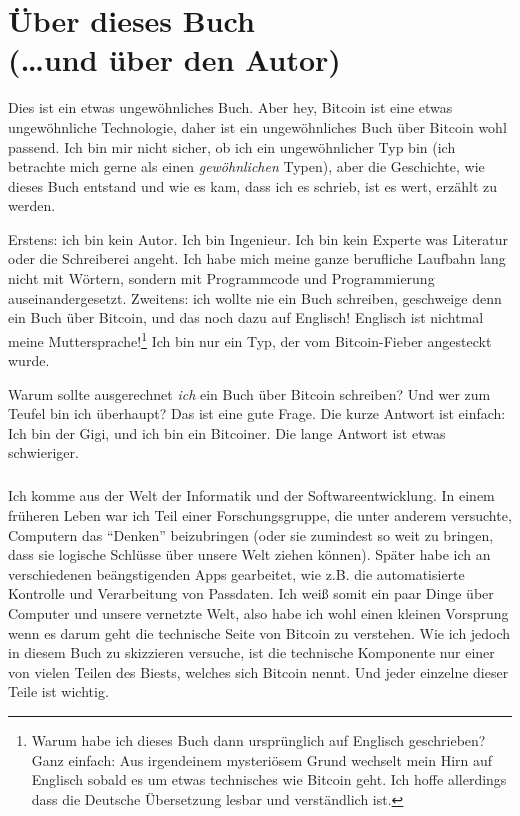 
\def\bitcoinB{\leavevmode
  {\setbox0=\hbox{\textsf{B}}%
    \dimen0\ht0 \advance\dimen0 0.2ex
    \ooalign{\hfil \box0\hfil\cr
      \hfil\vrule height \dimen0 depth.2ex\hfil\cr
    }%
  }%
}

\chapter*{Über dieses Buch \\ (\ldots und über den Autor)}

Dies ist ein etwas ungewöhnliches Buch. Aber hey, Bitcoin ist eine etwas
ungewöhnliche Technologie, daher ist ein ungewöhnliches Buch über Bitcoin wohl
passend. Ich bin mir nicht sicher, ob ich ein ungewöhnlicher Typ bin (ich
betrachte mich gerne als einen \textit{gewöhnlichen} Typen), aber die
Geschichte, wie dieses Buch entstand und wie es kam, dass ich es schrieb, ist es
wert, erzählt zu werden.

Erstens: ich bin kein Autor. Ich bin Ingenieur. Ich bin kein Experte was
Literatur oder die Schreiberei angeht. Ich habe mich meine ganze berufliche
Laufbahn lang nicht mit Wörtern, sondern mit Programmcode und Programmierung
auseinandergesetzt. Zweitens: ich wollte nie ein Buch schreiben, geschweige denn
ein Buch über Bitcoin, und das noch dazu auf Englisch! Englisch ist nichtmal
meine Muttersprache!\footnote{Warum habe ich dieses Buch dann ursprünglich auf
Englisch geschrieben? Ganz einfach: Aus irgendeinem mysteriösem Grund wechselt
mein Hirn auf Englisch sobald es um etwas technisches wie Bitcoin geht. Ich
hoffe allerdings dass die Deutsche Übersetzung lesbar und verständlich ist.} Ich
bin nur ein Typ, der vom Bitcoin-Fieber angesteckt wurde.

Warum sollte ausgerechnet \textit{ich} ein Buch über Bitcoin schreiben? Und wer
zum Teufel bin ich überhaupt? Das ist eine gute Frage. Die kurze Antwort ist
einfach: Ich bin der Gigi, und ich bin ein Bitcoiner. Die lange Antwort ist
etwas schwieriger.

\paragraph{}
Ich komme aus der Welt der Informatik und der Softwareentwicklung. In einem
früheren Leben war ich Teil einer Forschungsgruppe, die unter anderem versuchte,
Computern das \enquote{Denken} beizubringen (oder sie zumindest so weit zu
bringen, dass sie logische Schlüsse über unsere Welt ziehen können). Später habe
ich an verschiedenen beängstigenden Apps gearbeitet, wie z.B. die automatisierte
Kontrolle und Verarbeitung von Passdaten. Ich weiß somit ein paar Dinge über
Computer und unsere vernetzte Welt, also habe ich wohl einen kleinen Vorsprung
wenn es darum geht die technische Seite von Bitcoin zu verstehen. Wie ich jedoch
in diesem Buch zu skizzieren versuche, ist die technische Komponente nur einer
von vielen  Teilen des Biests, welches sich Bitcoin nennt. Und jeder einzelne
dieser Teile ist wichtig.

